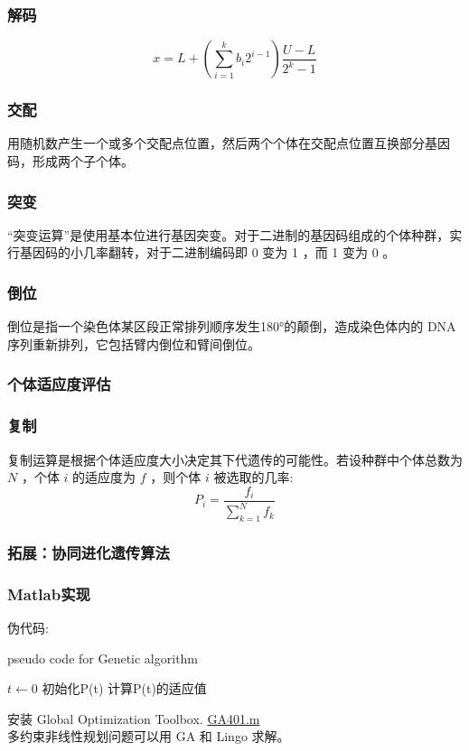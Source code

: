 \documentclass[12pt,a4paper]{article}
\begin{document}
\subsubsection{解码}
$$x = L + (\sum_{i = 1}^kb_i2^{i-1})\frac{U-L}{2^k-1}$$
\subsubsection{交配}
用随机数产生一个或多个交配点位置，然后两个个体在交配点位置互换部分基因码，形成两个子个体。
\subsubsection{突变}
“突变运算”是使用基本位进行基因突变。对于二进制的基因码组成的个体种群，实行基因码的小几率翻转，对于二进制编码即 0 变为 1 ，而 1 变为 0 。
\subsubsection{倒位}
倒位是指一个染色体某区段正常排列顺序发生180°的颠倒，造成染色体内的 DNA 序列重新排列，它包括臂内倒位和臂间倒位。
\subsubsection{个体适应度评估}
\subsubsection{复制}
复制运算是根据个体适应度大小决定其下代遗传的可能性。若设种群中个体总数为 $N$ ，个体 $i$ 的适应度为 $f$ ，则个体 $i$ 被选取的几率:
$$P_i = \frac{f_i}{\sum_{k = 1}^{N}f_k}$$
\subsubsection{拓展：协同进化遗传算法}
\newpage
\subsubsection{Matlab实现}
伪代码:

\begin{minipage}[t]{0.9\textwidth}
  \begin{algorithm}[H]
    \BlankLine
    \caption{pseudo code for Genetic algorithm}
    $t\leftarrow 0$\;
    初始化P(t)\;
    计算P(t)的适应值\;
  \end{algorithm}
\end{minipage}

安装 Global Optimization Toolbox.
\href{run:matlab/P4-1/GA401.m}{GA401.m}\\
多约束非线性规划问题可以用 GA 和 Lingo 求解。
\end{document}
